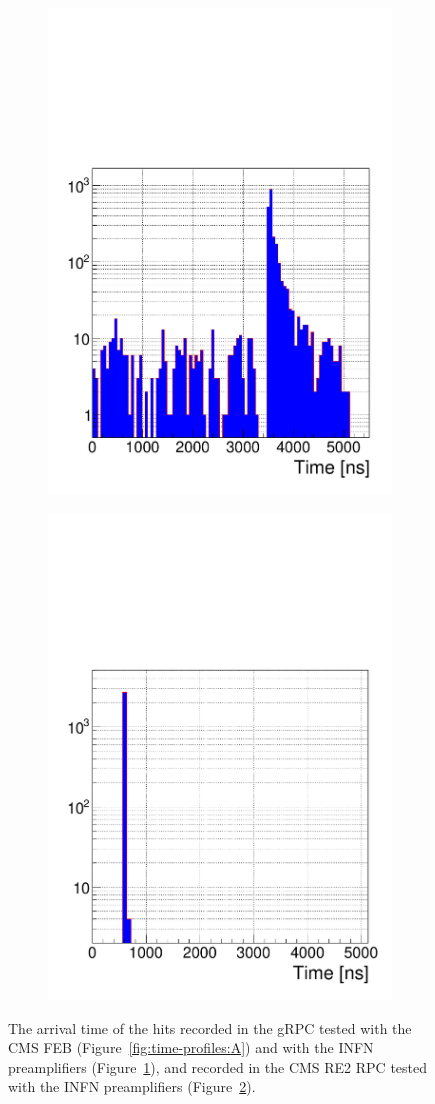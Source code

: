 \begin{figure}[H]
\begin{subfigure}{.5\linewidth}
			\includegraphics[width = .9\linewidth]{fig/chapt6/Muon-Time-Profile-gRPC-INFN.pdf}
			\caption{\label{fig:time-profiles:B}}
		\end{subfigure}
		\begin{subfigure}{\linewidth}
		    \centering
			\includegraphics[width = .45\linewidth]{fig/chapt6/Muon-Time-Profile-RE2-INFN.pdf}
			\caption{\label{fig:time-profiles:C}}
		\end{subfigure}
		\caption{\label{fig:time-profiles} The arrival time of the hits recorded in the gRPC tested with the CMS FEB (Figure~\ref{fig:time-profiles:A}) and with the INFN preamplifiers (Figure~\ref{fig:time-profiles:B}), and recorded in the CMS RE2 RPC tested with the INFN preamplifiers (Figure~\ref{fig:time-profiles:C}).}
	\end{figure}

